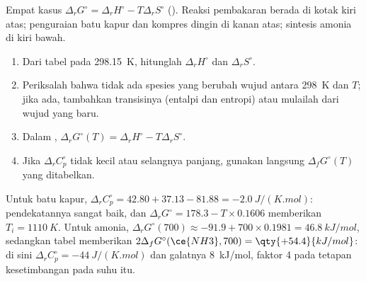 \begin{omfigure}

{\small Empat kasus $\Delta_r G^\circ = \Delta_r H^\circ - T\Delta_r
S^\circ$ (). Reaksi pembakaran berada di kotak kiri
atas; penguraian batu kapur dan kompres dingin di kanan atas; sintesis
amonia di kiri bawah.}
\end{omfigure}

\begin{method}\label{met:b2:reaction-free-energy:delta-g-standard}
\begin{enumerate}
  \item Dari tabel pada \qty{298.15}{K}, hitunglah $\Delta_r H^\circ$ dan
        $\Delta_r S^\circ$.
  \item Periksalah bahwa tidak ada spesies yang berubah wujud antara
        \qty{298}{K} dan $T$; jika ada, tambahkan transisinya (entalpi dan
        entropi) atau mulailah dari wujud yang baru.
  \item Dalam , $\Delta_r G^\circ(T) = \Delta_r H^\circ
        - T\Delta_r S^\circ$.
  \item Jika $\Delta_r C^\circ_p$ tidak kecil atau selangnya panjang,
        gunakan langsung $\Delta_f G^\circ(T)$ yang ditabelkan.
\end{enumerate}
\end{method}

\begin{example}\label{ex:b2:reaction-free-energy:tests}
Untuk batu kapur, $\Delta_r C^\circ_p = 42.80 + 37.13 - 81.88 =
\qty{-2.0}{J/(K.mol)}$: pendekatannya sangat baik, dan $\Delta_r
G^\circ = 178.3 - T \times 0.1606$ memberikan $T_i = \qty{1110}{K}$. Untuk
amonia, $\Delta_r G^\circ(700) \approx -91.9 + 700 \times 0.1981 =
\qty{+46.8}{kJ/mol}$, sedangkan tabel memberikan
$2\Delta_f G^\circ(\ce{NH3}, 700) =
\qty{+54.4}{kJ/mol}$: di sini
$\Delta_r C^\circ_p = \qty{-44}{J/(K.mol)}$ dan galatnya \qty{8}{kJ/mol},
faktor 4 pada tetapan kesetimbangan pada suhu itu.
\end{example}

